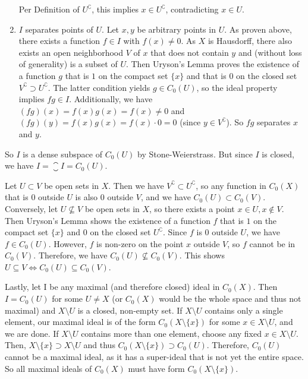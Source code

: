 \documentclass[a4paper]{article}
\begin{document}
\begin{enumerate}
    Per Definition of $U^\complement$, this implies $x \in U^\complement$, contradicting $x \in U$.
    \item $I$ separates points of $U$. Let $x,y$ be arbitrary points in $U$.
    As proven above, there exists a function $f \in I$ with $f(x) \neq 0$.
    As $X$ is Hausdorff, there also exists an open neighborhood $V$ of $x$ that does not contain $y$ and (without loss of generality) is a subset of $U$.
    Then Uryson's Lemma proves the existence of a function $g$ that is $1$ on the compact set $\{x\}$ and that is $0$ on the closed set $V^\complement \supset U^\complement$.
    The latter condition yields $g \in C_0(U)$, so the ideal property implies $fg \in I$.
    Additionally, we have $(fg)(x) = f(x) g(x) = f(x) \neq 0$ and $(fg)(y) = f(x) g(x) = f(x) \cdot 0 = 0$ (since $y \in V^\complement$). So $fg$ separates $x$ and $y$.
\end{enumerate}
So $I$ is a dense subspace of $C_0(U)$ by Stone-Weierstrass.
But since $I$ is closed, we have $I = \closure{I} = C_0(U)$.

Let $U \subset V$ be open sets in $X$.
Then we have $V^\complement \subset U^\complement$, so any function in $C_0(X)$ that is $0$ outside $U$ is also $0$ outside $V$, and we have $C_0(U) \subset C_0(V)$.
Conversely, let $U \nsubseteq V$ be open sets in $X$, so there exists a point $x \in U, x \notin V$.
Then Uryson's Lemma shows the existence of a function $f$ that is $1$ on the compact set $\{x\}$ and $0$ on the closed set $U^\complement$.
Since $f$ is $0$ outside $U$, we have $f \in C_0(U)$.
However, $f$ is non-zero on the point $x$ outside $V$, so $f$ cannot be in $C_0(V)$.
Therefore, we have $C_0(U) \nsubseteq C_0(V)$.
This shows $U \subseteq V \iff C_0(U) \subseteq C_0(V)$.

Lastly, let I be any maximal (and therefore closed) ideal in $C_0(X)$.
Then $I = C_0(U)$ for some $U \neq X$ (or $C_0(X)$ would be the whole space and thus not maximal) and $X \setminus U$ is a closed, non-empty set.
If $X \setminus U$ contains only a single element, our maximal ideal is of the form $C_0(X \setminus \{x\})$ for some $x \in X \setminus U$, and we are done.
If $X \setminus U$ contains more than one element, choose any fixed $x \in X \setminus U$.
Then, $X \setminus \{x\} \supset X \setminus U$ and thus $C_0(X\setminus\{x\}) \supset C_0(U)$.
Therefore, $C_0(U)$ cannot be a maximal ideal, as it has a super-ideal that is not yet the entire space.
So all maximal ideals of $C_0(X)$ must have form $C_0(X\setminus\{x\})$.
\end{document}
